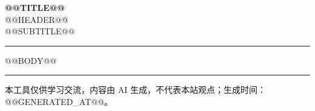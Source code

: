 \documentclass[12pt,a4paper]{article}
\begin{document}
\if\relax{}\relax
\linespread{1.1}\selectfont
\setlength{\parskip}{0.2em}
\else
\begin{center}
{\LARGE\bfseries @@TITLE@@}\\[0.5em]
{\small\color{gray} @@HEADER@@}\\[0.25em]
{\small\color{gray} @@SUBTITLE@@}
\end{center}

\vspace{0.35em}
\hrule
\vspace{0.9em}
\fi

@@BODY@@

\if\relax{}\relax\else
\vfill
\noindent\rule{\linewidth}{0.3pt}
{\footnotesize\color{gray} 本工具仅供学习交流，内容由 AI 生成，不代表本站观点；生成时间：@@GENERATED_AT@@。}
\fi
\end{document}
